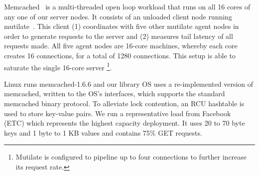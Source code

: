 




Memcached~\cite{mcd} is a multi-threaded open loop workload that runs on all 16 cores of any one of our server nodes. It consists of an unloaded client node running mutilate~\cite{mutilate}. This client (1) coordinates with five other mutilate agent nodes in order to generate requests to the server and (2) measures tail latency of all requests made. All five agent nodes are 16-core machines, whereby each core creates 16 connections, for a total of 1280 connections. This setup is able to saturate the single 16-core server
\footnote{Mutilate is configured to pipeline up to four connections to further increase its request rate.}.

Linux runs memcached-1.6.6 and our library OS uses a re-implemented version of memcached, written to the OS's interfaces, which supports the standard memcached binary protocol. To alleviate lock contention, an RCU hashtable is used to store key-value pairs.
We run a representative load from Facebook~\cite{workloadanalysisfacebook} (ETC) which represents the highest capacity deployment. It uses 20 to 70 byte keys and 1 byte to 1 KB values and contains 75\% GET requests.

